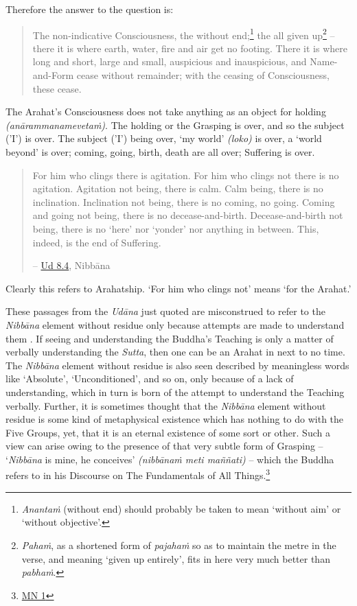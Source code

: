 Therefore the answer to the question is:

\begin{quote}
The non-indicative Consciousness, the without end;\footnote{\emph{Anantaṁ} (without end) should probably be taken to mean `without aim' or `without objective'.} the all given up\footnote{\emph{Pahaṁ}, as a shortened form of \emph{pajahaṁ} so as to maintain the metre in the verse, and meaning `given up entirely', fits in here very much better than \emph{pabhaṁ}.} -- there it is where earth, water, fire and air get no footing. There it is where long and short, large and small, auspicious and inauspicious, and Name-and-Form cease without remainder; with the ceasing of Consciousness, these cease.
\end{quote}

The Arahat's Consciousness does not take anything as an object for holding \emph{(anārammanamevetaṁ)}. The holding or the Grasping is over, and so the subject ('I') is over. The subject ('I') being over, `my world' \emph{(loko)} is over, a `world beyond' is over; coming, going, birth, death are all over; Suffering is over.

\begin{quote}
For him who clings there is agitation. For him who clings not there is no agitation. Agitation not being, there is calm. Calm being, there is no inclination. Inclination not being, there is no coming, no going. Coming and going not being, there is no decease-and-birth. Decease-and-birth not being, there is no `here' nor `yonder' nor anything in between. This, indeed, is the end of Suffering.

 -- \href{https://suttacentral.net/ud8.4/en/anandajoti}{Ud 8.4}, Nibbāna
\end{quote}

Clearly this refers to Arahatship. `For him who clings not' means `for the Arahat.'

These passages from the \emph{Udāna} just quoted are misconstrued to refer to the \emph{Nibbāna} element without residue only because attempts are made to understand them . If seeing and understanding the Buddha's Teaching is only a matter of verbally understanding the \emph{Sutta}, then one can be an Arahat in next to no time. The \emph{Nibbāna} element without residue is also seen described by meaningless words like `Absolute', `Unconditioned', and so on, only because of a lack of understanding, which in turn is born of the attempt to understand the Teaching verbally. Further, it is sometimes thought that the \emph{Nibbāna} element without residue is some kind of metaphysical existence which has nothing to do with the Five Groups, yet, that it is an eternal existence of some sort or other. Such a view can arise owing to the presence of that very subtle form of Grasping -- `\emph{Nibbāna} is mine, he conceives' \emph{(nibbānaṁ meti maññati)} -- which the Buddha refers to in his Discourse on The Fundamentals of All Things.\footnote{\href{https://suttacentral.net/mn1/en/bodhi}{MN 1}}

